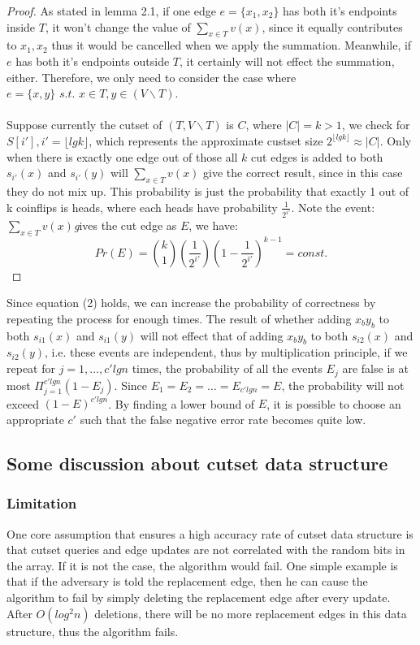 \documentclass[conference,compsoc]{IEEEtran}
\begin{document}
\begin{proof}
As stated in lemma 2.1, if one edge $e=\{x_1,x_2\}$ has both it's endpoints inside $T$,  it won't change the value of $\sum_{x\in T} v(x)$, since it equally contributes to $x_1, x_2$ thus it would be cancelled when we apply the summation. Meanwhile, if $e$ has both it's endpoints outside $T$, it certainly will not effect the summation, either. Therefore, we only need to consider the case where $e=\{x,y\} \textit{ s.t. } x\in T, y \in (V\backslash T)$.\\\\ Suppose currently the cutset of $(T,V\backslash T)$ is $C$, where $|C|=k>1$, we check for $S[i'],i'=\lfloor lgk\rfloor$, which represents the approximate custset size $2^{\lfloor lgk\rfloor} \approx |C| $. Only when there is exactly one edge out of those all $k$ cut edges is added to both $s_{i'}(x)$ and $s_{i'}(y)$ will $\sum_{x\in T} v(x)$ give the correct result, since in this case they do not mix up. This probability is just the probability that exactly 1 out of k coinflips is heads, where each heads have probability $\frac{1}{2^{i'}}$. Note the event:$\sum_{x\in T} v(x)$\textit gives the cut edge as $E$, we have:
$$Pr(E)={k \choose 1}(\frac{1}{2^{i'}})(1-\frac{1}{2^{i'}})^{k-1} = const.$$
\end{proof}
Since equation (2) holds, we can increase the probability of correctness by repeating the process for enough times. The result of whether adding $x_by_b$ to both $s_{i1}(x)$ and $s_{i1}(y)$ will not effect that of adding $x_by_b$ to both  $s_{i2}(x)$ and $s_{i2}(y)$, i.e. these events are independent, thus by multiplication principle, if we repeat for $j=1,\dots,c'lgn$ times, the probability of all the events $E_j$ are false is at most $\Pi_{j=1}^{c'lgn}(1-E_j)$. Since $E_1=E_2=\dots=E_{c'lgn}=E$, the probability will not exceed $(1-E)^{c'lgn}$. By finding a lower bound of $E$, it is possible to choose an appropriate $c'$ such that the false negative error rate becomes quite low.
\subsection{Some discussion about cutset data structure}
\subsubsection*{Limitation}One core assumption that ensures a high accuracy rate of cutset data structure is that cutset queries and edge updates are not correlated with the random bits in the array. If it is not the case, the algorithm would fail. One simple example is that if the adversary is told the replacement edge, then he can cause the algorithm to fail by simply deleting the replacement edge after every update. After $O(log^2n)$ deletions, there will be no more replacement edges in this data structure, thus the algorithm fails.
\end{document}
